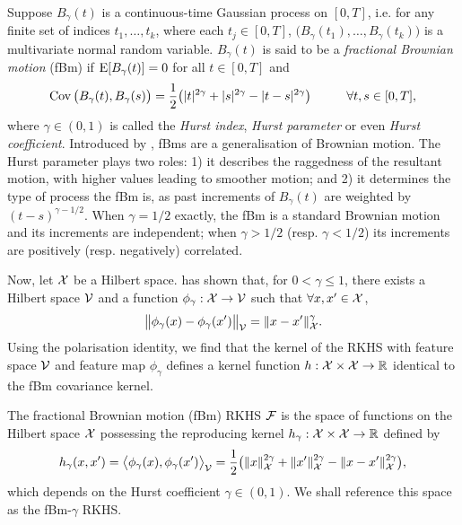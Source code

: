 Suppose $B_\gamma(t)$ is a continuous-time Gaussian process on $[0,T]$, i.e. for any finite set of indices $t_1,\dots,t_k$, where each $t_j \in [0,T]$, $\big(B_\gamma(t_1),\dots,B_\gamma(t_k)\big)$ is a multivariate normal random variable.
$B_\gamma(t)$ is said to be a \emph{fractional Brownian motion} (fBm) if $\operatorname{E} [B_\gamma(t)] = 0$ for all $t \in [0,T]$ and 
\vspace{-0.5em}
\[
  \operatorname{Cov}\big( B_\gamma(t),B_\gamma(s) \big) = \frac{1}{2}\big( |t|^{2\gamma} + |s|^{2\gamma} - |t-s|^{2\gamma} \big) \hspace{1cm} \forall t,s \in [0,T],
\]
where $\gamma \in (0,1)$ is called the \emph{Hurst index}, \emph{Hurst parameter} or even \emph{Hurst coefficient}.
Introduced by \citet{mandelbrot1968fractional}, fBms are a generalisation of Brownian motion.
The Hurst parameter plays two roles: 1) it describes the raggedness of the resultant motion, with higher values leading to smoother motion; and 2) it determines the type of process the fBm is, as past increments of $B_\gamma(t)$ are weighted by $(t-s)^{\gamma-1/2}$.
When $\gamma=1/2$ exactly, the fBm is a standard Brownian motion and its increments are independent; when $\gamma > 1/2$ (resp. $\gamma < 1/2$) its increments are positively (resp. negatively) correlated.

Now, let ${\mathcal X}$ be a Hilbert space. 
\citet[Thm. 3]{schoenberg1937} has shown that, for $0 < \gamma\leq 1$, there exists a Hilbert space ${\mathcal V}$ and a function $\phi_\gamma:{\mathcal X}\to{\mathcal V}$ such that $\forall x,x' \in {\mathcal X}$,
\[
  \big\Vert \phi_\gamma(x) - \phi_\gamma(x') \big\Vert_{\mathcal V} = \lVert x-x'\rVert_{\mathcal X}^\gamma.
\]
Using the polarisation identity, 
we find that the kernel of the RKHS with feature space ${\mathcal V}$ and feature map $\phi_\gamma$ defines a kernel function $h:{\mathcal X}\times{\mathcal X}\to\mathbb{R}$ identical to the fBm covariance kernel.

\begin{definition}\label{def:fbmrkhs}
  \hspace{-1.7pt}The fractional Brownian motion (fBm) RKHS ${\mathcal F}$ is the space of functions on the Hilbert space ${\mathcal X}$ possessing the reproducing kernel $h_\gamma:{\mathcal X}\times{\mathcal X}\to\mathbb{R}$ defined by
  \[
    h_\gamma(x,x') = \big\langle \phi_\gamma(x), \phi_\gamma(x') \big\rangle_{\mathcal V} = \frac{1}{2}\big( \lVert x\rVert_{\mathcal X}^{2\gamma} + \lVert x'\rVert_{\mathcal X}^{2\gamma} - \lVert x-x'\rVert_{\mathcal X}^{2\gamma} \big),
  \]
  which depends on the Hurst coefficient $\gamma \in (0,1)$.
  We shall reference this space as the fBm-$\gamma$ RKHS.
\end{definition}


